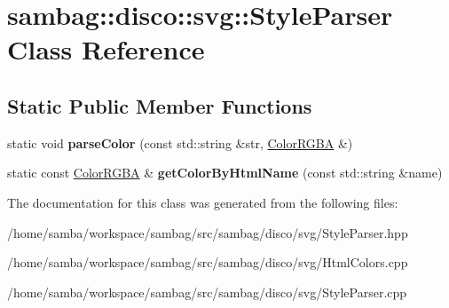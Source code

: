 \hypertarget{classsambag_1_1disco_1_1svg_1_1_style_parser}{
\section{sambag::disco::svg::StyleParser Class Reference}
\label{classsambag_1_1disco_1_1svg_1_1_style_parser}
}
\subsection*{Static Public Member Functions}
\begin{DoxyCompactItemize}
\item 
\hypertarget{classsambag_1_1disco_1_1svg_1_1_style_parser_a09d0fec40da8b0a23a34c03f211c6464}{
static void {\bfseries parseColor} (const std::string \&str, \hyperlink{structsambag_1_1com_1_1_color_r_g_b_a}{ColorRGBA} \&)}
\label{classsambag_1_1disco_1_1svg_1_1_style_parser_a09d0fec40da8b0a23a34c03f211c6464}

\item 
\hypertarget{classsambag_1_1disco_1_1svg_1_1_style_parser_a05efaee1ead9727a36ce2442467e9d7b}{
static const \hyperlink{structsambag_1_1com_1_1_color_r_g_b_a}{ColorRGBA} \& {\bfseries getColorByHtmlName} (const std::string \&name)}
\label{classsambag_1_1disco_1_1svg_1_1_style_parser_a05efaee1ead9727a36ce2442467e9d7b}

\end{DoxyCompactItemize}


The documentation for this class was generated from the following files:\begin{DoxyCompactItemize}
\item 
/home/samba/workspace/sambag/src/sambag/disco/svg/StyleParser.hpp\item 
/home/samba/workspace/sambag/src/sambag/disco/svg/HtmlColors.cpp\item 
/home/samba/workspace/sambag/src/sambag/disco/svg/StyleParser.cpp\end{DoxyCompactItemize}
